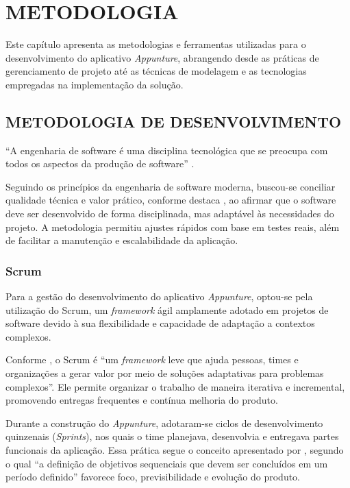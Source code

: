 \chapter{METODOLOGIA} \label{cha:metodologia}

Este capítulo apresenta as metodologias e ferramentas utilizadas para o desenvolvimento do aplicativo \textit{Appunture}, abrangendo desde as práticas de gerenciamento de projeto até as técnicas de modelagem e as tecnologias empregadas na implementação da solução.

\section{METODOLOGIA DE DESENVOLVIMENTO} \label{sec:metodologia_dev}

``A engenharia de software é uma disciplina tecnológica que se preocupa com todos os aspectos da produção de software'' \cite{pressman2016}.

Seguindo os princípios da engenharia de software moderna, buscou-se conciliar qualidade técnica e valor prático, conforme destaca , ao afirmar que o software deve ser desenvolvido de forma disciplinada, mas adaptável às necessidades do projeto. A metodologia permitiu ajustes rápidos com base em testes reais, além de facilitar a manutenção e escalabilidade da aplicação.

\subsection{Scrum}

Para a gestão do desenvolvimento do aplicativo \textit{Appunture}, optou-se pela utilização do Scrum, um \textit{framework} ágil amplamente adotado em projetos de software devido à sua flexibilidade e capacidade de adaptação a contextos complexos.

Conforme , o Scrum é ``um \textit{framework} leve que ajuda pessoas, times e organizações a gerar valor por meio de soluções adaptativas para problemas complexos''. Ele permite organizar o trabalho de maneira iterativa e incremental, promovendo entregas frequentes e contínua melhoria do produto.

Durante a construção do \textit{Appunture}, adotaram-se ciclos de desenvolvimento quinzenais (\textit{Sprints}), nos quais o time planejava, desenvolvia e entregava partes funcionais da aplicação. Essa prática segue o conceito apresentado por , segundo o qual ``a definição de objetivos sequenciais que devem ser concluídos em um período definido'' favorece foco, previsibilidade e evolução do produto.

